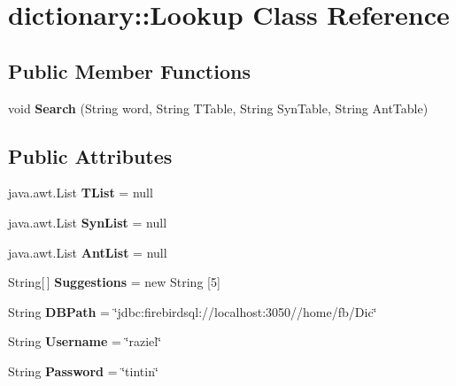 \hypertarget{classdictionary_1_1_lookup}{
\section{dictionary::Lookup Class Reference}
\label{classdictionary_1_1_lookup}
}
\subsection*{Public Member Functions}
\begin{DoxyCompactItemize}
\item 
\hypertarget{classdictionary_1_1_lookup_aef4edb74d17f9c052a88c19d48444229}{
void {\bfseries Search} (String word, String TTable, String SynTable, String AntTable)}
\label{classdictionary_1_1_lookup_aef4edb74d17f9c052a88c19d48444229}

\end{DoxyCompactItemize}
\subsection*{Public Attributes}
\begin{DoxyCompactItemize}
\item 
\hypertarget{classdictionary_1_1_lookup_acd24fae5021d116c6fcb41062279e7f7}{
java.awt.List {\bfseries TList} = null}
\label{classdictionary_1_1_lookup_acd24fae5021d116c6fcb41062279e7f7}

\item 
\hypertarget{classdictionary_1_1_lookup_a7edd0be4eb51f7440084a5c7a42a56a8}{
java.awt.List {\bfseries SynList} = null}
\label{classdictionary_1_1_lookup_a7edd0be4eb51f7440084a5c7a42a56a8}

\item 
\hypertarget{classdictionary_1_1_lookup_a190db3eabb45a3c4c7dac1b0585da7a4}{
java.awt.List {\bfseries AntList} = null}
\label{classdictionary_1_1_lookup_a190db3eabb45a3c4c7dac1b0585da7a4}

\item 
\hypertarget{classdictionary_1_1_lookup_a03b12b8c39c94d47d2a38a30b29d8077}{
String\mbox{[}$\,$\mbox{]} {\bfseries Suggestions} = new String \mbox{[}5\mbox{]}}
\label{classdictionary_1_1_lookup_a03b12b8c39c94d47d2a38a30b29d8077}

\item 
\hypertarget{classdictionary_1_1_lookup_a2044e061f004129da2ba3c2c5bb0a78e}{
String {\bfseries DBPath} = \char`\"{}jdbc:firebirdsql://localhost:3050//home/fb/Dic\char`\"{}}
\label{classdictionary_1_1_lookup_a2044e061f004129da2ba3c2c5bb0a78e}

\item 
\hypertarget{classdictionary_1_1_lookup_ad656ac9ff2f81abbc62a962e265af0ac}{
String {\bfseries Username} = \char`\"{}raziel\char`\"{}}
\label{classdictionary_1_1_lookup_ad656ac9ff2f81abbc62a962e265af0ac}

\item 
\hypertarget{classdictionary_1_1_lookup_ada1edf13fee4ac2fffe24a8cebb6996e}{
String {\bfseries Password} = \char`\"{}tintin\char`\"{}}
\label{classdictionary_1_1_lookup_ada1edf13fee4ac2fffe24a8cebb6996e}

\end{DoxyCompactItemize}


